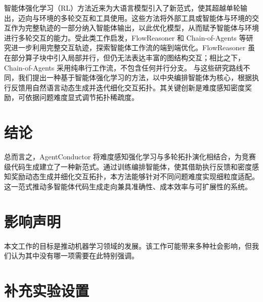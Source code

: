 \documentclass{article}
\theoremstyle{definition}
\begin{document}
智能体强化学习（RL）方法\citep{wang2025ragen, jin2025search}近来为大语言模型引入了新范式，使其超越单轮输出，迈向与环境的多轮交互和工具使用。这些方法将外部工具或智能体与环境的交互作为完整轨迹的一部分纳入智能体输出，以此优化模型，从而赋予智能体与环境进行多轮交互的能力。受此类工作启发，FlowReasoner\citep{gao2025flowreasoner} 和 Chain-of-Agents\citep{li2025chain} 等研究进一步利用完整交互轨迹，探索智能体工作流的端到端优化。FlowReasoner 虽在部分算子块中引入局部并行，但仍无法表达丰富的图结构交互；相比之下，Chain-of-Agents 采用纯串行工作流，不包含任何并行分支。
与这些研究路线不同，我们提出一种基于智能体强化学习的方法，以中央编排智能体为核心，根据执行反馈用自然语言动态生成并迭代细化交互拓扑。其关键创新是难度感知密度奖励，可依据问题难度显式调节拓扑稀疏度。
\section{结论}
总而言之，AgentConductor 将难度感知强化学习与多轮拓扑演化相结合，为竞赛级代码生成建立了一种新范式。通过训练编排智能体，使其借助执行反馈和密度感知奖励动态生成并细化交互拓扑，本方法能够针对不同问题难度实现细粒度适配。这一范式推动多智能体代码生成走向兼具准确性、成本效率与可扩展性的系统。

\section{影响声明}

本文工作的目标是推动机器学习领域的发展。该工作可能带来多种社会影响，但我们认为其中没有哪一项需要在此特别强调。
\nocite{langley00}




\newpage
\appendix
\onecolumn
\section{补充实验设置}
\end{document}
